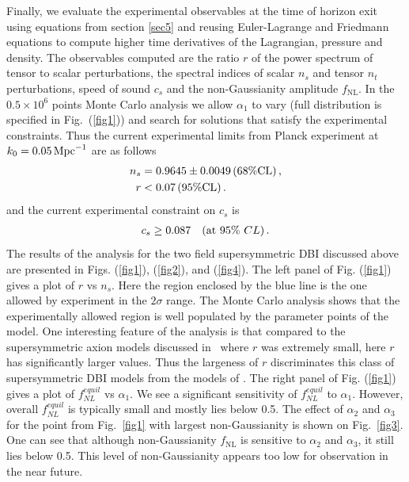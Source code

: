 \documentclass[a4paper,11pt]{article}
\def\non{\nonumber\\}
\def\non{\nonumber\\}
\begin{document}
  Finally, we evaluate the experimental observables at the time of horizon exit using equations from section \ref{sec5} and reusing Euler-Lagrange and Friedmann equations to compute higher time derivatives of the Lagrangian, pressure and density. The observables computed are the ratio $r$ of the power spectrum of tensor to scalar perturbations, the spectral indices of scalar $n_s$ and tensor $n_t$ perturbations, 
 speed of sound $c_s$ 
  and the non-Gaussianity amplitude $f_\text{NL}$.
    In the $0.5 \times 10^6$ points Monte Carlo analysis we allow $\alpha_1$ to vary
  (full distribution is specified in Fig.~(\ref{fig1}))
  and search for solutions that satisfy the experimental constraints. Thus the
  current experimental limits from Planck experiment at $k_0=0.05\, {\rm Mpc}^{-1}$ are as follows~\cite{Adam:2015rua,Ade:2015lrj,Array:2015xqh}
  \begin{align}
  	n_s& = 0.9645 \pm 0.0049\, (68\% {\rm CL})\,, \non
  	r & <0.07\, (95\% {\rm CL})\,.
  	\label{data}
  \end{align}
  and the current experimental constraint on $c_s$ is~\cite{Ade:2015lrj}
  \begin{align}
  	c_s\geq 0.087~~~({\rm at ~}95\% ~CL)\,.
  	\label{sound}
  \end{align}
  The results of the analysis for the two field supersymmetric DBI discussed above
  are presented in Figs. (\ref{fig1}), (\ref{fig2}), and (\ref{fig4}). The left panel of Fig. (\ref{fig1}) gives
  a plot of $r$ vs $n_s$. Here the region enclosed by the blue line is the one allowed by experiment in the $2\sigma$ range.
  The Monte Carlo analysis shows that the experimentally allowed region is well populated by the parameter points of the model.
  One interesting feature of the analysis is that compared to the
  supersymmetric axion models discussed in~\cite{Nath:2017ihp}
  where $r$ was extremely small, here $r$ has significantly
  larger values. Thus the largeness of $r$ discriminates this class of supersymmetric DBI models from the models
  of \cite{Nath:2017ihp}.
  The right panel of Fig. (\ref{fig1}) gives a plot of $f^{equil}_{NL}$ vs $\alpha_1$. We see a significant sensitivity
  of $f^{equil}_{NL}$ to $\alpha_1$. However, overall $f^{equil}_{NL}$ is typically small and mostly lies below 0.5. The effect of $\alpha_2$ and $\alpha_3$ for the point from Fig.~\ref{fig1} with largest non-Gaussianity is shown on Fig.~\ref{fig3}. One can see that although non-Gaussianity $f_\text{NL}$ is sensitive to $\alpha_2$ and $\alpha_3$, it still lies below 0.5. This level
  of non-Gaussianity appears too low for observation in the near future. 
  
\end{document}
